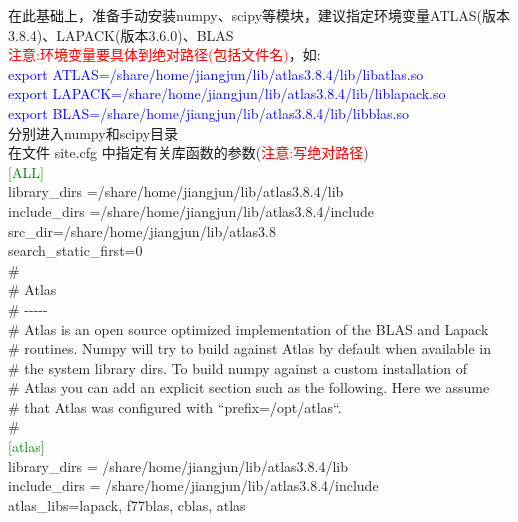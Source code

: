 \documentclass[10pt,a4paper]{article}
\begin{document}
在此基础上，准备手动安装\textrm{numpy}、\textrm{scipy}等模块，建议指定环境变量\textrm{ATLAS}(版本3.8.4)、\textrm{LAPACK}(版本3.6.0)、\textrm{BLAS}\\ 
\textcolor{red}{注意:环境变量要具体到绝对路径(包括文件名)}，如:\\
\textcolor{blue}{export ATLAS=/share/home/jiangjun/lib/atlas3.8.4/lib/libatlas.so}\\
\textcolor{blue}{export LAPACK=/share/home/jiangjun/lib/atlas3.8.4/lib/liblapack.so}\\
\textcolor{blue}{export BLAS=/share/home/jiangjun/lib/atlas3.8.4/lib/libblas.so}\\
分别进入\textrm{numpy}和\textrm{scipy}目录\\ 
在文件 site.cfg 中指定有关库函数的参数(\textcolor{red}{注意:写绝对路径})\\
\textcolor{green}{$[$ALL$]$}\\
library\_dirs =/share/home/jiangjun/lib/atlas3.8.4/lib \\
include\_dirs =/share/home/jiangjun/lib/atlas3.8.4/include \\
src\_dir=/share/home/jiangjun/lib/atlas3.8 \\
search\_static\_first=0 \\
\#
\\
\# Atlas\\
\# -\/-\/-\/-\/-\\
\# Atlas is an open source optimized implementation of the BLAS and Lapack\\
\# routines. Numpy will try to build against Atlas by default when available in\\
\# the system library dirs. To build numpy against a custom installation of\\
\# Atlas you can add an explicit section such as the following. Here we assume\\
\# that Atlas was configured with ``prefix=/opt/atlas``.\\
\#\\
\textcolor{green}{$[$atlas$]$}\\
library\_dirs = /share/home/jiangjun/lib/atlas3.8.4/lib \\
include\_dirs = /share/home/jiangjun/lib/atlas3.8.4/include \\
atlas\_libs=lapack, f77blas, cblas, atlas \\
\end{document}
